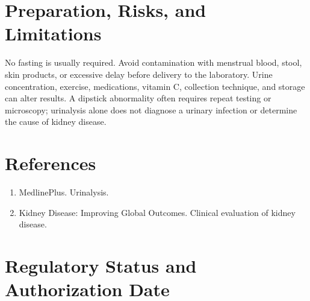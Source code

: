 \section*{Preparation, Risks, and Limitations}
No fasting is usually required. Avoid contamination with menstrual blood, stool, skin products, or excessive delay before delivery to the laboratory. Urine concentration, exercise, medications, vitamin C, collection technique, and storage can alter results. A dipstick abnormality often requires repeat testing or microscopy; urinalysis alone does not diagnose a urinary infection or determine the cause of kidney disease.

\section*{References}
\begin{enumerate}
  \item MedlinePlus. Urinalysis.
  \item Kidney Disease: Improving Global Outcomes. Clinical evaluation of kidney disease.
\end{enumerate}

\clearpage


\section*{Regulatory Status and Authorization Date}

\clearpage
